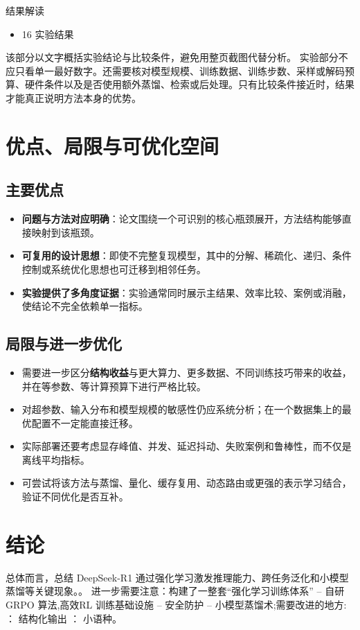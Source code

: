 \documentclass[UTF8,11pt,a4paper]{ctexart}
\newcommand{\term}[1]{\textbf{\textcolor{mainblue}{#1}}}
\begin{document}
\begin{notebox}{结果解读}
\begin{itemize}
\item 16 实验结果
\end{itemize}
\end{notebox}

该部分以文字概括实验结论与比较条件，避免用整页截图代替分析。
实验部分不应只看单一最好数字。还需要核对模型规模、训练数据、训练步数、采样或解码预算、硬件条件以及是否使用额外蒸馏、检索或后处理。只有比较条件接近时，结果才能真正说明方法本身的优势。

\section{优点、局限与可优化空间}
\subsection{主要优点}
\begin{itemize}
\item \term{问题与方法对应明确}：论文围绕一个可识别的核心瓶颈展开，方法结构能够直接映射到该瓶颈。
\item \term{可复用的设计思想}：即使不完整复现模型，其中的分解、稀疏化、递归、条件控制或系统优化思想也可迁移到相邻任务。
\item \term{实验提供了多角度证据}：实验通常同时展示主结果、效率比较、案例或消融，使结论不完全依赖单一指标。
\end{itemize}

\subsection{局限与进一步优化}
\begin{itemize}
\item 需要进一步区分\term{结构收益}与更大算力、更多数据、不同训练技巧带来的收益，并在等参数、等计算预算下进行严格比较。
\item 对超参数、输入分布和模型规模的敏感性仍应系统分析；在一个数据集上的最优配置不一定能直接迁移。
\item 实际部署还要考虑显存峰值、并发、延迟抖动、失败案例和鲁棒性，而不仅是离线平均指标。
\item 可尝试将该方法与蒸馏、量化、缓存复用、动态路由或更强的表示学习结合，验证不同优化是否互补。
\end{itemize}

\section{结论}
总体而言，总结 DeepSeek-R1 通过强化学习激发推理能力、跨任务泛化和小模型蒸馏等关键现象。。 进一步需要注意：构建了一整套“强化学习训练体系” – 自研GRPO 算法,高效RL 训练基础设施 – 安全防护 – 小模型蒸馏术;需要改进的地方: ： 结构化输出 ： 小语种。
\end{document}
